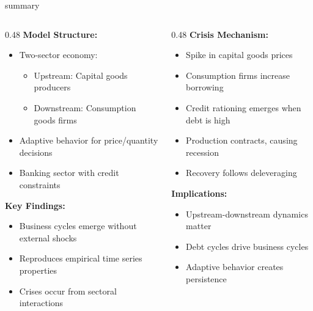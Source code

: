\documentclass[9pt]{beamer}
\begin{document}
\begin{frame}{\cite{assenza_emergent_2015} summary}
\begin{columns}[T]
\begin{column}{0.48\textwidth}
\textbf{Model Structure:}
\begin{itemize}
\item Two-sector economy:
  \begin{itemize}
  \item Upstream: Capital goods producers
  \item Downstream: Consumption goods firms
  \end{itemize}
\item Adaptive behavior for price/quantity decisions
\item Banking sector with credit constraints
\end{itemize}

\textbf{Key Findings:}
\begin{itemize}
\item Business cycles emerge without external shocks
\item Reproduces empirical time series properties
\item Crises occur from sectoral interactions
\end{itemize}
\end{column}

\begin{column}{0.48\textwidth}
\textbf{Crisis Mechanism:}
\begin{itemize}
\item Spike in capital goods prices
\item Consumption firms increase borrowing
\item Credit rationing emerges when debt is high
\item Production contracts, causing recession
\item Recovery follows deleveraging
\end{itemize}

\textbf{Implications:}
\begin{itemize}
\item Upstream-downstream dynamics matter
\item Debt cycles drive business cycles
\item Adaptive behavior creates persistence
\end{itemize}
\end{column}
\end{columns}
\end{frame}
\end{document}
